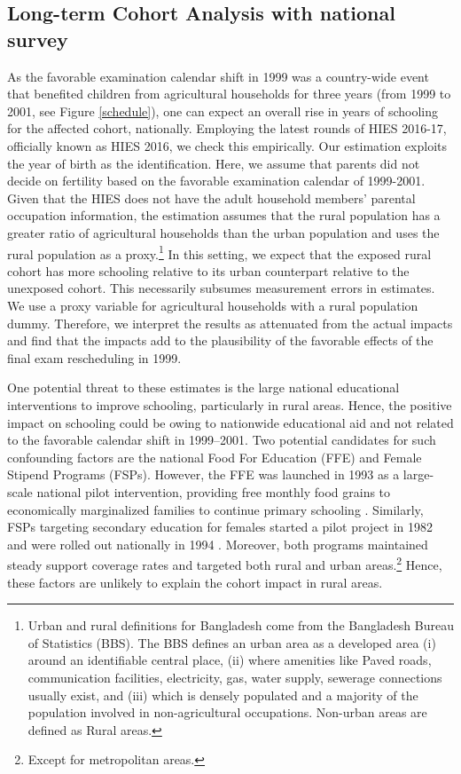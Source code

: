 \documentclass[12pt,letterpaper]{article}
\newcommand{\0}{\ensuremath{\mbox{\boldmath $0$}}}
\begin{document}
\subsection{Long-term Cohort Analysis with national survey}

As the favorable examination calendar shift in 1999 was a country-wide event that benefited children from agricultural households for three years (from 1999 to 2001, see Figure \ref{schedule}), one can expect an overall rise in years of schooling for the affected cohort, nationally. Employing the latest rounds of HIES 2016-17, officially known as HIES 2016, we check this empirically. Our estimation exploits the year of birth as the identification. Here, we assume that parents did not decide on fertility based on the favorable examination calendar of 1999-2001. Given that the HIES does not have the adult household members' parental occupation information, the estimation assumes that the rural population has a greater ratio of agricultural households than the urban population and uses the rural population as a proxy.\footnote{Urban and rural definitions for Bangladesh come from the Bangladesh Bureau of Statistics (BBS). The BBS defines an urban area as a developed area (i) around an identifiable central place, (ii) where amenities like Paved roads, communication facilities, electricity, gas, water supply, sewerage connections usually exist, and (iii) which is densely populated and a majority of the population involved in non-agricultural occupations. Non-urban areas are defined as Rural areas.} In this setting, we expect that the exposed rural cohort has more schooling relative to its urban counterpart relative to the unexposed cohort. This necessarily subsumes measurement errors in estimates. We use a proxy variable for agricultural households with a rural population dummy. Therefore, we interpret the results as attenuated from the actual impacts and find that the impacts add to the plausibility of the favorable effects of the final exam rescheduling in 1999.

One potential threat to these estimates is the large national educational interventions to improve schooling, particularly in rural areas. Hence, the positive impact on schooling could be owing to nationwide educational aid and not related to the favorable calendar shift in 1999–2001. Two potential candidates for such confounding factors are the national Food For Education (FFE) and Female Stipend Programs (FSPs). However, the FFE was launched in 1993 as a large-scale national pilot intervention, providing free monthly food grains to economically marginalized families to continue primary schooling  \citep{ahmed2002food}. Similarly, FSPs targeting secondary education for females started a pilot project in 1982 and were rolled out nationally in 1994  \citep{xu2022assessing}. Moreover, both programs maintained steady support coverage rates and targeted both rural and urban areas.\footnote{Except for metropolitan areas.} Hence, these factors are unlikely to explain the cohort impact in rural areas. 
\end{document}
